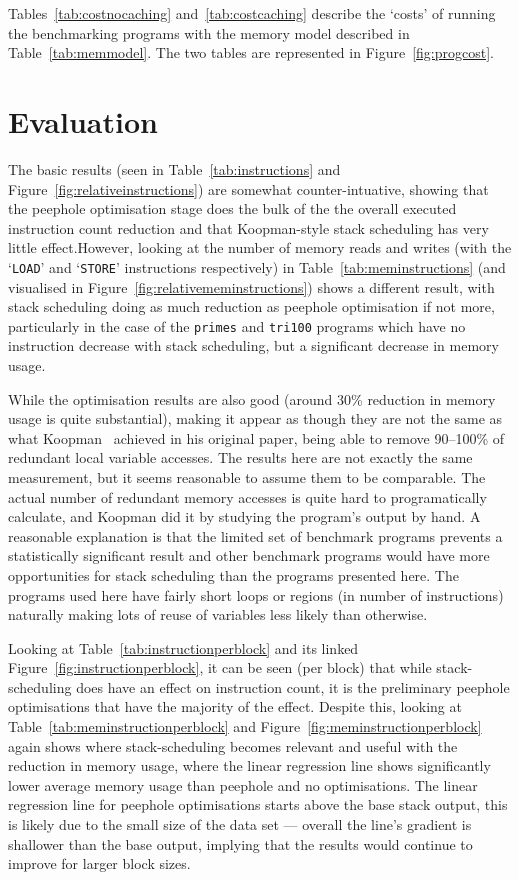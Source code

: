 Tables~\ref{tab:costnocaching} and~\ref{tab:costcaching} describe the `costs' of
running the benchmarking programs with the memory model described in
Table~\ref{tab:memmodel}. The two tables are represented in
Figure~\ref{fig:progcost}.

\section{Evaluation}\label{sec:testingevaluation}

The basic results (seen in Table~\ref{tab:instructions} and
Figure~\ref{fig:relativeinstructions}) are somewhat counter-intuative, showing
that the peephole optimisation stage does the bulk of the the overall executed
instruction count reduction and that Koopman-style stack scheduling has very
little effect.However, looking at the number of memory reads and writes (with
the `\texttt{LOAD}' and `\texttt{STORE}' instructions respectively) in
Table~\ref{tab:meminstructions} (and visualised in
Figure~\ref{fig:relativememinstructions}) shows a different result, with stack
scheduling doing as much reduction as peephole optimisation if not more,
particularly in the case of the \texttt{primes} and \texttt{tri100} programs
which have no instruction decrease with stack scheduling, but a significant
decrease in memory usage.

While the optimisation results are also good (around 30\% reduction in memory
usage is quite substantial), making it appear as though they are not the same as
what Koopman~\cite{Koopman1995Preliminary} achieved in his original paper, being
able to remove 90--100\% of redundant local variable accesses. The results here
are not exactly the same measurement, but it seems reasonable to assume them to
be comparable. The actual number of redundant memory accesses is quite hard to
programatically calculate, and Koopman did it by studying the program's output
by hand. A reasonable explanation is that the limited set of benchmark programs
prevents a statistically significant result and other benchmark programs would
have more opportunities for stack scheduling than the programs presented here.
The programs used here have fairly short loops or regions (in number of
instructions) naturally making lots of reuse of variables less likely than
otherwise.

Looking at Table~\ref{tab:instructionperblock} and its linked
Figure~\ref{fig:instructionperblock}, it can be seen (per block) that while
stack-scheduling does have an effect on instruction count, it is the preliminary
peephole optimisations that have the majority of the effect. Despite this,
looking at Table~\ref{tab:meminstructionperblock} and
Figure~\ref{fig:meminstructionperblock} again shows where stack-scheduling
becomes relevant and useful with the reduction in memory usage, where the linear
regression line shows significantly lower average memory usage than peephole and
no optimisations. The linear regression line for peephole optimisations starts
above the base stack output, this is likely due to the small size of the data
set --- overall the line's gradient is shallower than the base output, implying
that the results would continue to improve for larger block sizes.

